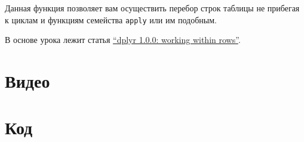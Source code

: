 \documentclass[
]{book}
\begin{document}
Данная функция позволяет вам осуществить перебор строк таблицы не прибегая к циклам и функциям семейства \texttt{apply} или им подобным.

В основе урока лежит статья \href{https://www.tidyverse.org/blog/2020/04/dplyr-1-0-0-rowwise/}{``dplyr 1.0.0: working within rows''}.

\hypertarget{ux432ux438ux434ux435ux43e-2}{%
\section{Видео}\label{ux432ux438ux434ux435ux43e-2}}

\hypertarget{ux43aux43eux434-2}{%
\section{Код}\label{ux43aux43eux434-2}}
\end{document}
